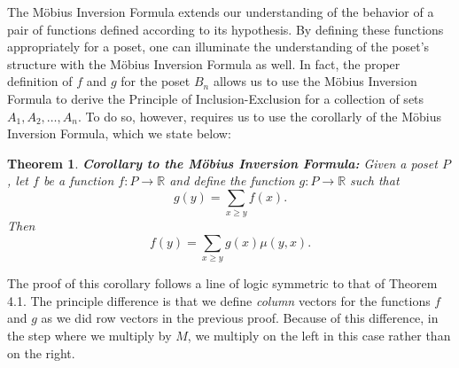 \documentclass{article} %
\theoremstyle{definition}
\theoremstyle{plain}
\newtheorem{thm}{Theorem}[section]
\begin{document}
The M\"{o}bius Inversion Formula extends our understanding of the behavior of a pair of functions defined according to its hypothesis. By defining these functions appropriately for a poset, one can illuminate the understanding of the poset's structure with the M\"{o}bius Inversion Formula as well. In fact, the proper definition of $f$ and $g$ for the poset $B_n$ allows us to use the M\"{o}bius Inversion Formula to derive the Principle of Inclusion-Exclusion for a collection of sets $A_1,A_2,\ldots,A_n$. To do so, however, requires us to use the corollarly of the M\"{o}bius Inversion Formula, which we state below:
\begin{thm} \textbf{Corollary to the M\"{o}bius Inversion Formula:} Given a poset $P$,
let $f$ be a function $f:P\rightarrow \mathbb{R}$ and define the function $g:P\rightarrow \mathbb{R}$ such that
$$g(y)=\sum_{x\ge y}f(x).$$
Then
$$f(y)=\sum_{x\ge y}g(x)\mu(y,x).$$
\end{thm}
The proof of this corollary follows a line of logic symmetric to that of Theorem 4.1. The principle difference is that we define \textit{column} vectors for the functions $f$ and $g$ as we did row vectors in the previous proof. Because of this difference, in the step where we multiply by $M$, we multiply on the left in this case rather than on the right.\\
\end{document}

